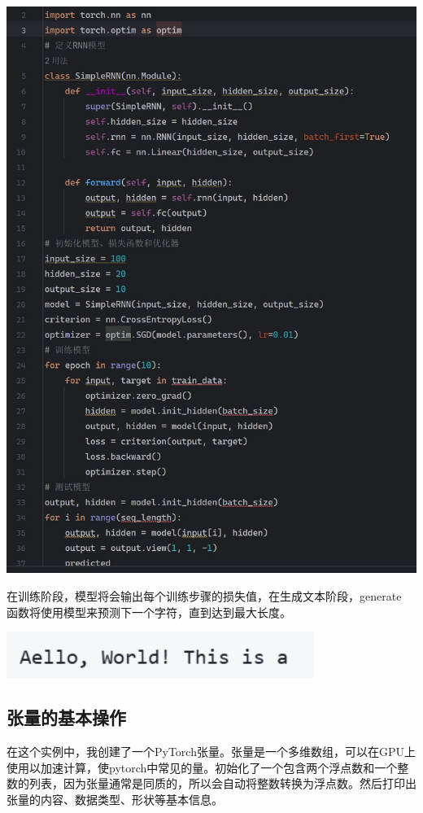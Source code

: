 \documentclass[UTF8,a4paper]{ctexart}
\begin{document}
\begin{sloppypar}
	\includegraphics[width = 16cm]{37}
	
	在训练阶段，模型将会输出每个训练步骤的损失值，在生成文本阶段，generate 函数将使用模型来预测下一个字符，直到达到最大长度。
	
	\includegraphics[width = 10cm]{37.1}
	
	\subsection{张量的基本操作}
	在这个实例中，我创建了一个PyTorch张量。张量是一个多维数组，可以在GPU上使用以加速计算，使pytorch中常见的量。初始化了一个包含两个浮点数和一个整数的列表，因为张量通常是同质的，所以会自动将整数转换为浮点数。然后打印出张量的内容、数据类型、形状等基本信息。
	

\end{sloppypar}
\end{document}
